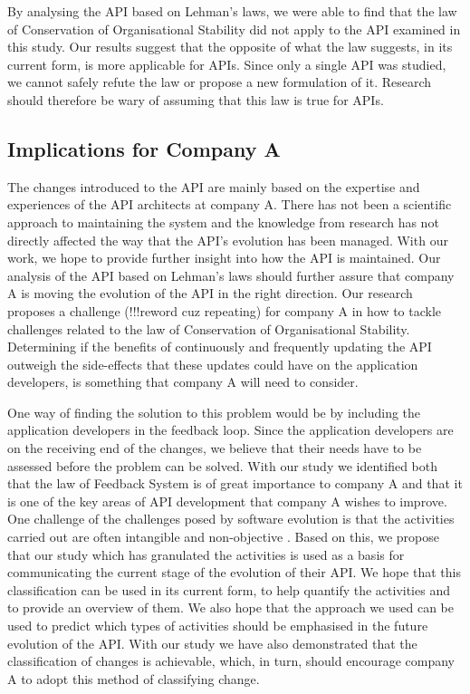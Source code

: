 \documentclass{sig-alternate}
\begin{document}
By analysing the API based on Lehman's laws, we were able to find that the law of Conservation of Organisational Stability did not apply to the API examined in this study. Our results suggest that the opposite of what the law suggests, in its current form, is more applicable for APIs. Since only a single API was studied, we cannot safely refute the law or propose a new formulation of it. Research should therefore be wary of assuming that this law is true for APIs.



\subsection{Implications for Company A}
The changes introduced to the API are mainly based on the expertise and experiences of the API architects at company A. There has not been a scientific approach to maintaining the system and the knowledge from research has not directly affected the way that the API's evolution has been managed. With our work, we hope to provide further insight into how the API is maintained. Our analysis of the API based on Lehman's laws should further assure that company A is moving the evolution of the API in the right direction. Our research proposes a challenge (!!!reword cuz repeating) for company A in how to tackle challenges related to the law of Conservation of Organisational Stability. Determining if the benefits of continuously and frequently updating the API outweigh the side-effects that these updates could have on the application developers, is something that company A will need to consider.

One way of finding the solution to this problem would be by including the application developers in the feedback loop. Since the application developers are on the receiving end of the changes, we believe that their needs have to be assessed before the problem can be solved. With our study we identified both that the law of Feedback System is of great importance to company A and that it is one of the key areas of API development that company A wishes to improve. One challenge of the challenges posed by software evolution is that the activities carried out are often intangible and non-objective \cite{chapin2001types, lientz1980software}. Based on this, we propose that our study which has granulated the activities is used as a basis for communicating the current stage of the evolution of their API. We hope that this classification can be used in its current form, to help quantify the activities and to provide an overview of them. We also hope that the approach we used can be used to predict which types of activities should be emphasised in the future evolution of the API. With our study we have also demonstrated that the classification of changes is achievable, which, in turn, should encourage company A to adopt this method of classifying change.
\end{document}
